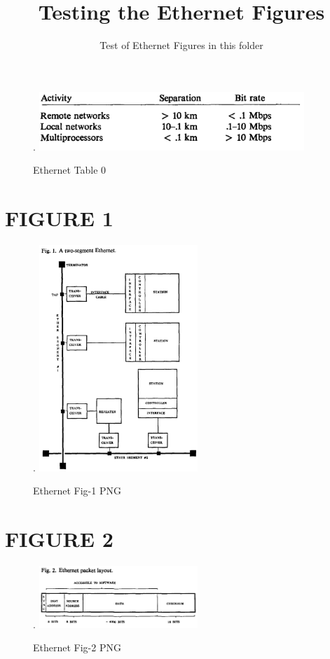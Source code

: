 \documentclass[11pt]{amsart}
\title{ \vspace{-80pt} Testing the Ethernet Figures }
\author{Test of Ethernet Figures in this folder}
\begin{document}
\maketitle
\vspace{-20pt}

\begin{figure}[h!]. \centering  \includegraphics[trim =0mm 0mm 0mm 0mm, clip, width=10cm]{Ethernet-Table-0.png}    \caption{Ethernet Table 0} \end{figure}



\section*{FIGURE 1} 

\newpage

\begin{figure}[h!]. \centering  \includegraphics[trim =0mm 0mm 0mm 0mm, clip, width=6cm]{Ethernet-Fig-1.png}    \caption{Ethernet Fig-1 PNG} \end{figure}

 

\newpage
\section*{FIGURE 2} 

\begin{figure}[h!]. \centering  \includegraphics[trim =0mm 0mm 0mm 0mm, clip, width=6cm]{Ethernet-Fig-2.png}    \caption{Ethernet Fig-2 PNG} \end{figure}
\end{document}
